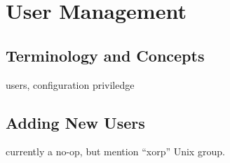\chapter{User Management}

\section{Terminology and Concepts}

users, configuration priviledge

\section{Adding New Users}

currently a no-op, but mention ``xorp'' Unix group.




